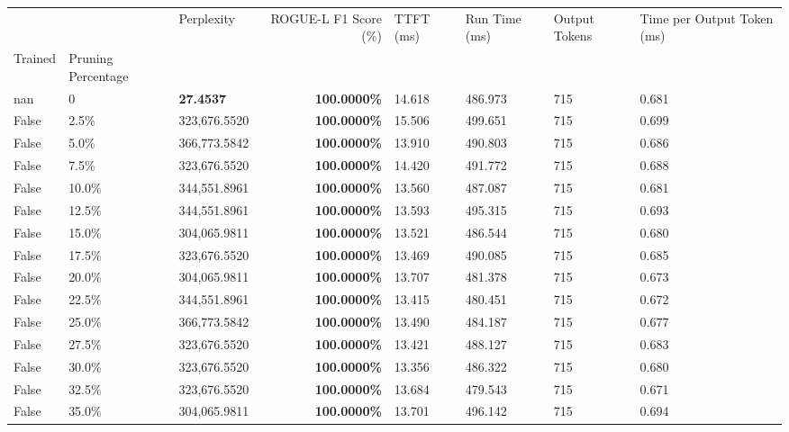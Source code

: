 \begin{table}[H]
\label{tab:evaluation-pipeline-2-untrained}
\begin{tabular}{lllrllll}
\toprule
 &  & Perplexity & ROGUE-L F1 Score (\%) & TTFT (ms) & Run Time (ms) & Output Tokens & Time per Output Token (ms) \\
Trained & Pruning Percentage &  &  &  &  &  &  \\
\midrule
nan & 0 & \bfseries 27.4537 & \bfseries 100.0000\% & 14.618 & 486.973 & 715 & 0.681 \\
\cline{1-8}
False & 2.5\% & 323,676.5520 & \bfseries \color{red} 100.0000\% & 15.506 & 499.651 & 715 & 0.699 \\
\cline{1-8}
False & 5.0\% & 366,773.5842 & \bfseries \color{red} 100.0000\% & 13.910 & 490.803 & 715 & 0.686 \\
\cline{1-8}
False & 7.5\% & 323,676.5520 & \bfseries \color{red} 100.0000\% & 14.420 & 491.772 & 715 & 0.688 \\
\cline{1-8}
False & 10.0\% & 344,551.8961 & \bfseries \color{red} 100.0000\% & 13.560 & 487.087 & 715 & 0.681 \\
\cline{1-8}
False & 12.5\% & 344,551.8961 & \bfseries \color{red} 100.0000\% & 13.593 & 495.315 & 715 & 0.693 \\
\cline{1-8}
False & 15.0\% & \color{red} 304,065.9811 & \bfseries \color{red} 100.0000\% & 13.521 & 486.544 & 715 & 0.680 \\
\cline{1-8}
False & 17.5\% & 323,676.5520 & \bfseries \color{red} 100.0000\% & 13.469 & 490.085 & 715 & 0.685 \\
\cline{1-8}
False & 20.0\% & \color{red} 304,065.9811 & \bfseries \color{red} 100.0000\% & 13.707 & 481.378 & 715 & 0.673 \\
\cline{1-8}
False & 22.5\% & 344,551.8961 & \bfseries \color{red} 100.0000\% & 13.415 & 480.451 & 715 & 0.672 \\
\cline{1-8}
False & 25.0\% & 366,773.5842 & \bfseries \color{red} 100.0000\% & 13.490 & 484.187 & 715 & 0.677 \\
\cline{1-8}
False & 27.5\% & 323,676.5520 & \bfseries \color{red} 100.0000\% & 13.421 & 488.127 & 715 & 0.683 \\
\cline{1-8}
False & 30.0\% & 323,676.5520 & \bfseries \color{red} 100.0000\% & 13.356 & 486.322 & 715 & 0.680 \\
\cline{1-8}
False & 32.5\% & 323,676.5520 & \bfseries \color{red} 100.0000\% & 13.684 & 479.543 & 715 & 0.671 \\
\cline{1-8}
False & 35.0\% & \color{red} 304,065.9811 & \bfseries \color{red} 100.0000\% & 13.701 & 496.142 & 715 & 0.694 \\

\end{tabular}
\end{table}
